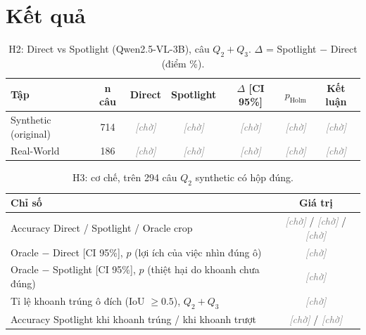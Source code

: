 \documentclass[12pt]{ai_conquer2026}
\newcommand{\fillin}[1]{\textcolor{gray}{\textit{[#1]}}}
\newcommand{\tbd}{\fillin{chờ}}
\begin{document}
\section{Kết quả}
\label{sec:results}

\begin{table}[h!]
\centering
\small
\caption{H2: Direct vs Spotlight (Qwen2.5-VL-3B), câu $Q_2{+}Q_3$. $\Delta$ = Spotlight $-$ Direct (điểm \%).}
\label{tab:h2}
\begin{tabular}{|l|c|c|c|c|c|c|}
\hline
\textbf{Tập} & \textbf{n câu} & \textbf{Direct} & \textbf{Spotlight} & \textbf{$\Delta$ [CI 95\%]} & \textbf{$p_{\text{Holm}}$} & \textbf{Kết luận} \\ \hline
Synthetic (original) & 714 & \tbd & \tbd & \tbd & \tbd & \tbd \\
Real-World & 186 & \tbd & \tbd & \tbd & \tbd & \tbd \\ \hline
\end{tabular}
\end{table}

\begin{table}[h!]
\centering
\small
\caption{H3: cơ chế, trên 294 câu $Q_2$ synthetic có hộp đúng.}
\label{tab:h3}
\begin{tabular}{|l|c|}
\hline
\textbf{Chỉ số} & \textbf{Giá trị} \\ \hline
Accuracy Direct / Spotlight / Oracle crop & \tbd{} / \tbd{} / \tbd \\
Oracle $-$ Direct [CI 95\%], $p$ (lợi ích của việc nhìn đúng ô) & \tbd \\
Oracle $-$ Spotlight [CI 95\%], $p$ (thiệt hại do khoanh chưa đúng) & \tbd \\
Tỉ lệ khoanh trúng ô đích (IoU $\ge 0.5$), $Q_2{+}Q_3$ & \tbd \\
Accuracy Spotlight khi khoanh trúng / khi khoanh trượt & \tbd{} / \tbd \\ \hline
\end{tabular}
\end{table}
\end{document}
